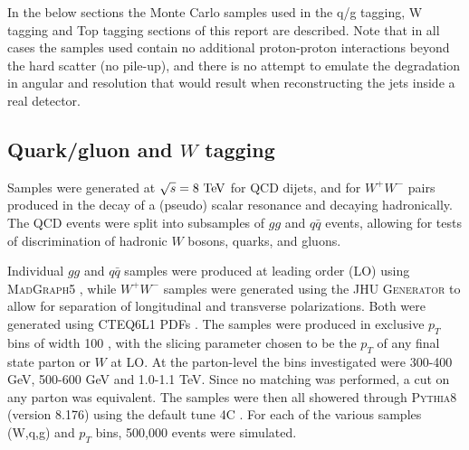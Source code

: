 In the below sections the Monte Carlo samples used in the q/g tagging,
W tagging and Top tagging sections of this report are described. Note
that in all cases the samples used contain no additional proton-proton
interactions beyond the hard scatter (no pile-up), and there is no
attempt to emulate the degradation in angular and \pt resolution that
would result when reconstructing the jets inside a real detector.


\subsection{Quark/gluon and $W$ tagging}

Samples were generated at $\sqrt{s} = 8\TeV$ for QCD dijets, and for $W^+W^-$
pairs produced in the decay of a (pseudo) scalar resonance and
decaying hadronically. The QCD events
were split into subsamples of $gg$ and $q\bar{q}$ events, allowing for tests of
discrimination of hadronic $W$ bosons, quarks, and gluons.

Individual $gg$ and $q\bar{q}$ samples were produced at leading order (LO)
using \textsc{MadGraph5} \cite{Alwall:2011uj}, while $W^+W^-$ samples were generated using
the \textsc{JHU Generator} \cite{Gao:2010qx,Bolognesi:2012mm,Anderson:2013afp} to allow for separation of longitudinal and
transverse polarizations. Both were generated using \textsc{CTEQ6L1}
PDFs \cite{Pumplin:2002vw}. The samples were produced in exclusive $p_T$ bins
of width 100 {\GeV}, with the slicing parameter
chosen to be the $p_T$ of any final state parton or $W$ at LO. At the
parton-level the \pt bins investigated were 300-400 GeV, 500-600 GeV
and 1.0-1.1 TeV. Since
no matching was performed, a cut on any parton was equivalent. The samples were
then all showered through \textsc{Pythia8} (version 8.176) \cite{Sjostrand:2007gs} using the default tune 4C \cite{Buckley:2011ms}.
For each of the various samples (W,q,g) and $p_T$ bins, 500,000 events were simulated.





